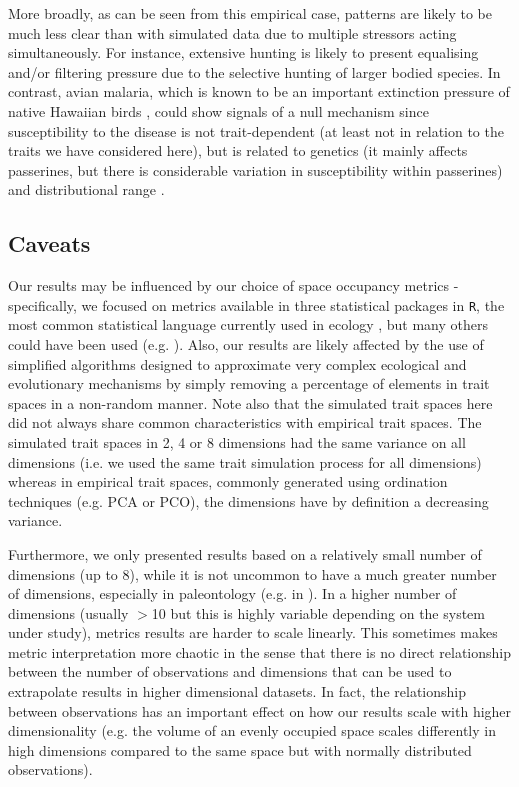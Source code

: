 \documentclass[12pt,letterpaper]{article}
\begin{document}
More broadly, as can be seen from this empirical case, patterns are likely to be much less clear than with simulated data due to multiple stressors acting simultaneously.
For instance, extensive hunting is likely to present equalising and/or filtering pressure due to the selective hunting of larger bodied species.
In contrast, avian malaria, which is known to be an important extinction pressure of native Hawaiian birds \citep{samuel2011dynamics}, could show signals of a null mechanism since susceptibility to the disease is not trait-dependent (at least not in relation to the traits we have considered here), but is related to genetics (it mainly affects passerines, but there is considerable variation in susceptibility within passerines) and distributional range \citep{jessup2023wildlife}.

\subsection{Caveats}

Our results may be influenced by our choice of space occupancy metrics - specifically, we focused on metrics available in three statistical packages in \texttt{R}, the most common statistical language currently used in ecology \citep{lai2019evaluating}, but many others could have been used (e.g. \citealt{guillerme2020shifting}).
Also, our results are likely affected by the use of simplified algorithms designed to approximate very complex ecological and evolutionary mechanisms by simply removing a percentage of elements in trait spaces in a non-random manner.
Note also that the simulated trait spaces here did not always share common characteristics with empirical trait spaces.
The simulated trait spaces in 2, 4 or 8 dimensions had the same variance on all dimensions (i.e. we used the same trait simulation process for all dimensions) whereas in empirical trait spaces, commonly generated using ordination techniques (e.g. PCA or PCO), the dimensions have by definition a decreasing variance.

Furthermore, we only presented results based on a relatively small number of dimensions (up to 8), while it is not uncommon to have a much greater number of dimensions, especially in paleontology (e.g. in \citealt{van2023should}).
In a higher number of dimensions (usually $>$10 but this is highly variable depending on the system under study), metrics results are harder to scale linearly.
This sometimes makes metric interpretation more chaotic \cite{bellman1957dynamic} in the sense that there is no direct relationship between the number of observations and dimensions that can be used to extrapolate results in higher dimensional datasets.
In fact, the relationship between observations has an important effect on how our results scale with higher dimensionality (e.g. the volume of an evenly occupied space scales differently in high dimensions compared to the same space but with normally distributed observations).
\end{document}
